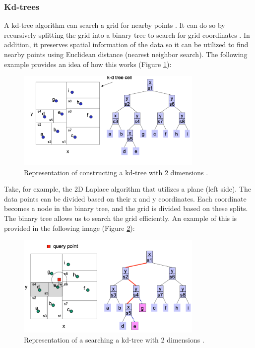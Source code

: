 \subsubsection*{Kd-trees} \label{theory:kd-trees}
A kd-tree algorithm can search a grid for nearby points \citep{bentley_multidimensional_1975}.
It can do so by recursively splitting the grid into a binary tree to search for grid coordinates \citep{washington_k-d_2002}.
In addition, it preserves spatial information of the data so it can be utilized to find nearby points using Euclidean distance (nearest neighbor search).
The following example provides an idea of how this works (Figure \ref{fig:kd-tree-theory}):
\begin{figure}[H]
  \includegraphics[width=0.8\textwidth]{TheorethicalFramework/ND-Laplace/Images/kd-tree-part1.png}
  \caption{Representation of constructing a kd-tree with 2 dimensions \citep{washington_k-d_2002}.}
  \label{fig:kd-tree-theory}
\end{figure}
Take, for example, the 2D Laplace algorithm that utilizes a plane (left side).
The data points can be divided based on their x and y coordinates.
Each coordinate becomes a node in the binary tree, and the grid is divided based on these splits.
The binary tree allows us to search the grid efficiently.
An example of this is provided in the following image (Figure \ref{fig:kd-tree-searching-theory}):
\begin{figure}[H]
  \includegraphics[width=0.8\textwidth]{TheorethicalFramework/ND-Laplace/Images/kd-tree-part2.png}
  \caption{Representation of a searching a kd-tree with 2 dimensions \citep{washington_k-d_2002}.}
  \label{fig:kd-tree-searching-theory}
\end{figure}
